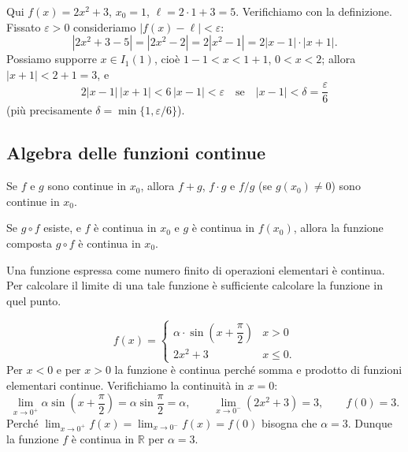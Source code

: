 \documentclass[11pt,a4paper]{article}
\begin{document}
\begin{esempio}[$\lim_{x\to 1}(2x^2 + 3) = 5$]
Qui $f(x) = 2x^2 + 3$, $x_0 = 1$, $\ell = 2\cdot 1 + 3 = 5$. Verifichiamo con la definizione. Fissato $\varepsilon > 0$ consideriamo $|f(x) - \ell| < \varepsilon$:
\[
|2x^2 + 3 - 5| = |2x^2 - 2| = 2|x^2 - 1| = 2|x - 1|\cdot|x + 1| .
\]
Possiamo supporre $x \in I_1(1)$, cioè $1 - 1 < x < 1 + 1$, $0 < x < 2$; allora $|x + 1| < 2 + 1 = 3$, e
\[
2|x - 1|\,|x + 1| < 6\,|x - 1| < \varepsilon \quad\text{se}\quad |x - 1| < \delta = \frac{\varepsilon}{6}
\]
(più precisamente $\delta = \min\{1, \varepsilon/6\}$).
\end{esempio}

\subsection{Algebra delle funzioni continue}

\begin{teorema}
Se $f$ e $g$ sono continue in $x_0$, allora $f + g$, $f \cdot g$ e $f/g$ (se $g(x_0) \neq 0$) sono continue in $x_0$.
\end{teorema}

\begin{teorema}
Se $g \circ f$ esiste, e $f$ è continua in $x_0$ e $g$ è continua in $f(x_0)$, allora la funzione composta $g \circ f$ è continua in $x_0$.
\end{teorema}

\begin{osservazione}[Conseguenza]
Una funzione espressa come numero finito di operazioni elementari è continua. Per calcolare il limite di una tale funzione è sufficiente calcolare la funzione in quel punto.
\end{osservazione}

\begin{esempio}
\[
f(x) = \begin{cases} \alpha \cdot \sin\!\left(x + \dfrac{\pi}{2}\right) & x > 0 \\[2mm] 2x^2 + 3 & x \le 0 .\end{cases}
\]
Per $x < 0$ e per $x > 0$ la funzione è continua perché somma e prodotto di funzioni elementari continue. Verifichiamo la continuità in $x = 0$:
\[
\lim_{x\to 0^+} \alpha \sin\!\left(x + \frac{\pi}{2}\right) = \alpha \sin\frac{\pi}{2} = \alpha, \qquad
\lim_{x\to 0^-} (2x^2 + 3) = 3, \qquad f(0) = 3 .
\]
Perché $\lim_{x\to 0^+} f(x) = \lim_{x\to 0^-} f(x) = f(0)$ bisogna che $\alpha = 3$. Dunque la funzione $f$ è continua in $\mathbb{R}$ per $\alpha = 3$.
\end{esempio}
\end{document}
